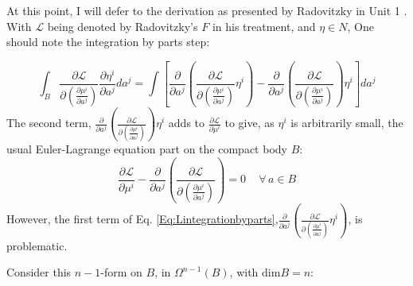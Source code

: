 \documentclass[twoside,landscape,10pt]{amsart}
\theoremstyle{plain}
\theoremstyle{definition}
\theoremstyle{remark}
\begin{document}
\begin{multicols*}{2}
At this point, I will defer to the derivation as presented by Radovitzky in Unit 1 \cite{RRadovitzky2003}.  With $\mathcal{L}$ being denoted by Radovitzky's $F$ in his treatment, and $\eta \in N$, One should note the integration by parts step:

\begin{equation}\label{Eq:Lintegrationbyparts}
\int_B \frac{ \partial \mathcal{L}}{ \partial \left( \frac{ \partial \mu^i}{ \partial a^j} \right)} \frac{ \partial \eta^i}{ \partial a^j} da^j = \int \left[ \frac{ \partial }{ \partial a^j} \left( \frac{ \partial \mathcal{L}}{ \partial \left( \frac{ \partial \mu^i}{ \partial a^j} \right) } \eta^i \right) - \frac{ \partial }{ \partial a^j} \left( \frac{ \partial \mathcal{L}}{ \partial \left( \frac{ \partial \mu^i}{ \partial a^j} \right) } \right) \eta^i \right] da^j
\end{equation}
The second term, $\frac{ \partial }{ \partial a^j} \left( \frac{ \partial \mathcal{L}}{ \partial \left( \frac{ \partial \mu^i}{ \partial a^j} \right) } \right) \eta^i$ adds to $\frac{ \partial \mathcal{L}}{ \partial \mu^i}$ to give, as $\eta^i$ is arbitrarily small, the usual Euler-Lagrange equation part on the compact body $B$:
\begin{equation}
\boxed{ \frac{ \partial \mathcal{L}}{ \partial \mu^i} - \frac{ \partial }{ \partial a^j} \left( \frac{ \partial \mathcal{L}}{ \partial \left( \frac{ \partial \mu^i}{ \partial a^j} \right) } \right) = 0 \quad \, \forall \, a \in B }
\end{equation}
However, the first term of Eq. \ref{Eq:Lintegrationbyparts},$\frac{ \partial }{ \partial a^j} \left( \frac{ \partial \mathcal{L}}{ \partial \left( \frac{ \partial \mu^i}{ \partial a^j} \right) } \eta^i \right)$, is problematic.  

Consider this $n-1$-form on $B$, in $\Omega^{n-1}(B)$, with $\text{dim}B = n$:


\end{multicols*}
\end{document}

